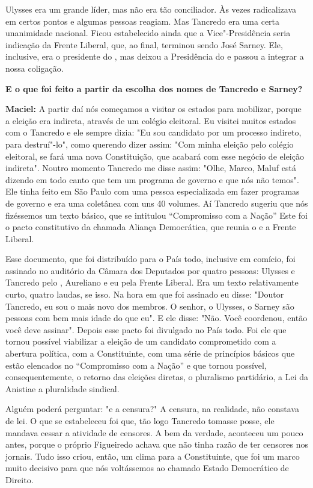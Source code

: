Ulysses era um grande líder, mas não era tão conciliador. Às vezes
radicalizava em certos pontos e algumas pessoas reagiam. Mas Tancredo
era uma certa unanimidade nacional. Ficou estabelecido ainda que a
Vice"-Presidência seria indicação da Frente Liberal, que, ao final,
terminou sendo José Sarney. Ele, inclusive, era o presidente do , mas
deixou a Presidência do  e passou a integrar a nossa coligação.

\textbf{E o que foi feito a partir da escolha dos nomes de Tancredo e
Sarney? }

\textbf{Maciel:} A partir daí nós começamos a visitar os estados para
mobilizar, porque a eleição era indireta, através de um colégio
eleitoral. Eu visitei muitos estados com o Tancredo e ele sempre dizia:
"Eu sou candidato por um processo indireto, para destruí"-lo", como
querendo dizer assim: "Com minha eleição pelo colégio eleitoral, se fará
uma nova Constituição, que acabará com esse negócio de eleição
indireta". Noutro momento Tancredo me disse assim: "Olhe, Marco, Maluf
está dizendo em todo canto que tem um programa de governo e que nós não
temos". Ele tinha feito em São Paulo com uma pessoa especializada em
fazer programas de governo e era uma coletânea com uns 40 volumes. Aí
Tancredo sugeriu que nós fizéssemos um texto básico, que se intitulou
``Compromisso com a Nação'' Este foi o pacto constitutivo da chamada
Aliança Democrática, que reunia o  e a Frente Liberal.

Esse documento, que foi distribuído para o País todo, inclusive em
comício, foi assinado no auditório da Câmara dos Deputados por quatro
pessoas: Ulysses e Tancredo pelo , Aureliano e eu pela Frente
Liberal. Era um texto relativamente curto, quatro laudas, se isso. Na
hora em que foi assinado eu disse: "Doutor Tancredo, eu sou o mais novo
dos membros. O senhor, o Ulysses, o Sarney são pessoas com bem mais
idade do que eu". E ele disse: "Não. Você coordenou, então você deve
assinar". Depois esse pacto foi divulgado no País todo. Foi ele que
tornou possível viabilizar a eleição de um candidato comprometido com a
abertura política, com a Constituinte, com uma série de princípios
básicos que estão elencados no ``Compromisso com a Nação'' e que tornou
possível, consequentemente, o retorno das eleições diretas, o pluralismo
partidário, a Lei da Anistiae a pluralidade sindical.

Alguém poderá perguntar: "e a censura?" A censura, na realidade, não
constava de lei. O que se estabeleceu foi que, tão logo Tancredo tomasse
posse, ele mandava cessar a atividade de censores. A bem da verdade,
aconteceu um pouco antes, porque o próprio Figueiredo achava que não
tinha razão de ter censores nos jornais. Tudo isso criou, então, um
clima para a Constituinte, que foi um marco muito decisivo para que nós
voltássemos ao chamado Estado Democrático de Direito.

